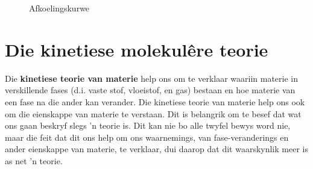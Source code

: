 \begin{minipage}{0.5\textwidth}
\begin{figure}[H]
\begin{center}
 \end{center}
\caption{Afkoelingskurwe}
\end{figure}
\end{minipage}

         \section{Die kinetiese molekul\^{e}re teorie}
    \nopagebreak

Die \textbf{kinetiese teorie van materie} help ons om te verklaar waariin materie in verskillende fases (d.i. vaste stof, vloeistof, en gas) bestaan en hoe materie van een fase na die ander kan verander. Die kinetiese teorie van materie help ons ook om die eienskappe van materie te verstaan.  Dit is belangrik om te besef dat wat ons gaan beskryf slegs 'n teorie is. Dit kan nie bo alle twyfel bewys word nie, maar die feit dat dit ons help om ons waarnemings, van fase-veranderings en ander eienskappe van materie, te verklaar, dui daarop dat dit waarskynlik meer is as net 'n teorie. 

